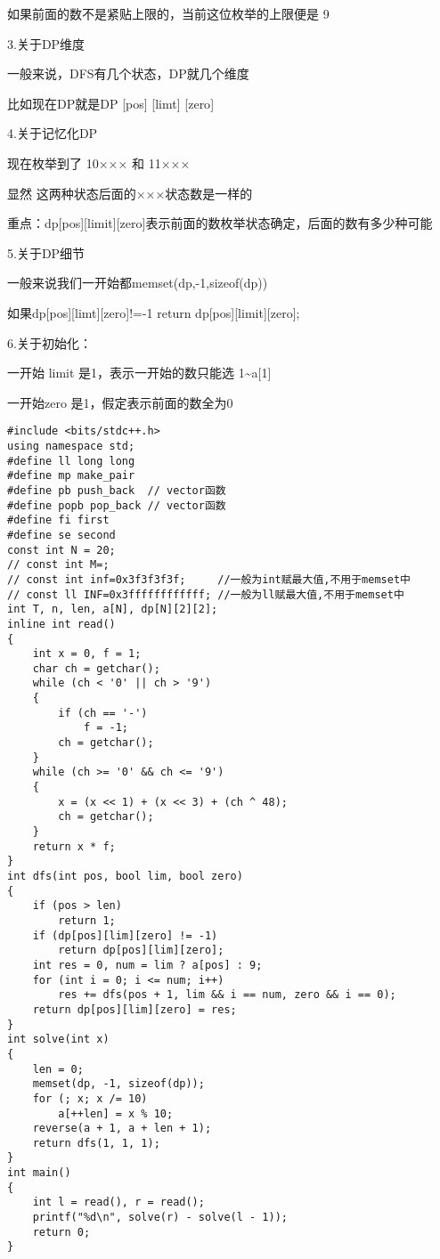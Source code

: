 \documentclass[]{article}
\begin{document}
如果前面的数不是紧贴上限的，当前这位枚举的上限便是 9

3.关于DP维度

一般来说，DFS有几个状态，DP就几个维度　　

比如现在DP就是DP {[}pos{]} {[}limt{]} {[}zero{]}

4.关于记忆化DP

现在枚举到了 10××× 和 11×××

显然 这两种状态后面的×××状态数是一样的

重点：dp{[}pos{]}{[}limit{]}{[}zero{]}表示前面的数枚举状态确定，后面的数有多少种可能

5.关于DP细节

一般来说我们一开始都memset(dp,-1,sizeof(dp))

如果dp{[}pos{]}{[}limt{]}{[}zero{]}!=-1 return
dp{[}pos{]}{[}limit{]}{[}zero{]};

6.关于初始化：

一开始 limit 是1，表示一开始的数只能选 1\textasciitilde a{[}1{]}

一开始zero 是1，假定表示前面的数全为0

\begin{verbatim}
#include <bits/stdc++.h>
using namespace std;
#define ll long long
#define mp make_pair
#define pb push_back  // vector函数
#define popb pop_back // vector函数
#define fi first
#define se second
const int N = 20;
// const int M=;
// const int inf=0x3f3f3f3f;     //一般为int赋最大值,不用于memset中
// const ll INF=0x3ffffffffffff; //一般为ll赋最大值,不用于memset中
int T, n, len, a[N], dp[N][2][2];
inline int read()
{
    int x = 0, f = 1;
    char ch = getchar();
    while (ch < '0' || ch > '9')
    {
        if (ch == '-')
            f = -1;
        ch = getchar();
    }
    while (ch >= '0' && ch <= '9')
    {
        x = (x << 1) + (x << 3) + (ch ^ 48);
        ch = getchar();
    }
    return x * f;
}
int dfs(int pos, bool lim, bool zero)
{
    if (pos > len)
        return 1;
    if (dp[pos][lim][zero] != -1)
        return dp[pos][lim][zero];
    int res = 0, num = lim ? a[pos] : 9;
    for (int i = 0; i <= num; i++)
        res += dfs(pos + 1, lim && i == num, zero && i == 0);
    return dp[pos][lim][zero] = res;
}
int solve(int x)
{
    len = 0;
    memset(dp, -1, sizeof(dp));
    for (; x; x /= 10)
        a[++len] = x % 10;
    reverse(a + 1, a + len + 1);
    return dfs(1, 1, 1);
}
int main()
{
    int l = read(), r = read();
    printf("%d\n", solve(r) - solve(l - 1));
    return 0;
}
\end{verbatim}
\end{document}
